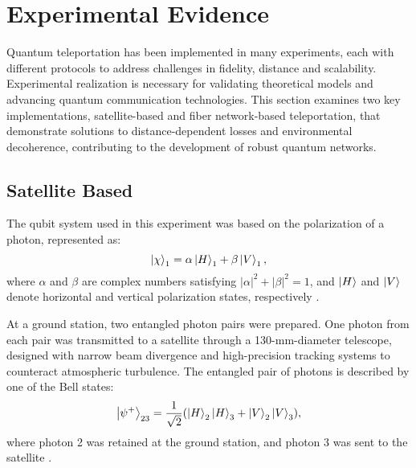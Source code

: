 \section{Experimental Evidence}
Quantum teleportation has been implemented in many experiments, 
each with different protocols to address challenges in fidelity, distance and scalability. 
Experimental realization is necessary for validating theoretical models and advancing quantum communication technologies. 
This section examines two key implementations, satellite-based and fiber network-based teleportation, that demonstrate 
solutions to distance-dependent losses and environmental decoherence, contributing to the development of robust quantum networks.

\subsection{Satellite Based}


The qubit system used in this experiment was based on the polarization of a photon, represented as:  
\begin{equation}
    \ket{\chi}_1 = \alpha\ket{H}_1 + \beta\ket{V}_1,
\end{equation}
where \(\alpha\) and \(\beta\) are complex numbers satisfying \(|\alpha|^2 + |\beta|^2 = 1\), and \(\ket{H}\) and \(\ket{V}\) denote 
horizontal and vertical polarization states, respectively \cite{Ren:2017}.  

At a ground station, two entangled photon pairs were prepared. One photon from each pair was transmitted to a satellite through a 
130-mm-diameter telescope, designed with narrow beam divergence and high-precision tracking systems to counteract atmospheric turbulence. 
The entangled pair of photons is described by one of the Bell states:
\begin{equation}
    \ket{\psi^{+}}_{23} = \frac{1}{\sqrt{2}} (\ket{H}_2\ket{H}_3 + \ket{V}_2\ket{V}_3),
\end{equation}
where photon 2 was retained at the ground station, and photon 3 was sent to the satellite \cite{Ren:2017}.

